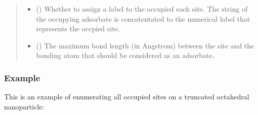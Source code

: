 \documentclass[letterpaper,10pt,english]{sphinxmanual}
\begin{document}
\begin{fulllineitems}
\begin{quote}
\begin{description}
\begin{itemize}
\item {} 
 (\sphinxstyleliteralemphasis{\sphinxupquote{, }}) \textendash{} Whether to assign a label to the occupied each site. The string
of the occupying adsorbate is concatentated to the numerical
label that represents the occpied site.

\item {} 
 (\sphinxstyleliteralemphasis{\sphinxupquote{, }}) \textendash{} The maximum bond length (in Angstrom) between the site and the
bonding atom  that should be considered as an adsorbate.

\end{itemize}

\end{description}\end{quote}
\subsubsection*{Example}

This is an example of enumerating all occupied sites on a truncated
octahedral nanoparticle:


\end{fulllineitems}
\end{document}
